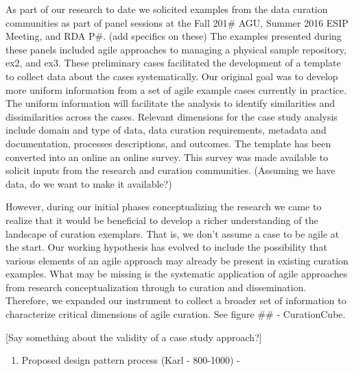 \documentclass[paper]{ijdc-v9}
\begin{document}
As part of our research to date we solicited examples from the data
curation communities as part of panel sessions at the Fall 201\# AGU,
Summer 2016 ESIP Meeting, and RDA P\#. (add specifics on these) The
examples presented during these panels included agile approaches to
managing a physical sample repository, ex2, and ex3. These preliminary
cases facilitated the development of a template to collect data about
the cases systematically. Our original goal was to develop more uniform
information from a set of agile example cases currently in practice. The
uniform information will facilitate the analysis to identify
similarities and dissimilarities across the cases. Relevant dimensions
for the case study analysis include domain and type of data, data
curation requirements, metadata and documentation, processes
descriptions, and outcomes. The template has been converted into an
online an online survey. This survey was made available to solicit
inputs from the research and curation communities. (Assuming we have
data, do we want to make it available?)

However, during our initial phases conceptualizing the research we came
to realize that it would be beneficial to develop a richer understanding
of the landscape of curation exemplars. That is, we don't assume a case
to be agile at the start. Our working hypothesis has evolved to include
the possibility that various elements of an agile approach may already
be present in existing curation examples. What may be missing is the
systematic application of agile approaches from research
conceptualization through to curation and dissemination. Therefore, we
expanded our instrument to collect a broader set of information to
characterize critical dimensions of agile curation. See figure \#\# -
CurationCube.

{[}Say something about the validity of a case study approach?{]}

\begin{enumerate}
\def\labelenumi{\arabic{enumi}.}
\setcounter{enumi}{2}
\itemsep1pt\parskip0pt
\item
  Proposed design pattern process (Karl - 800-1000) -
\end{enumerate}
\end{document}
